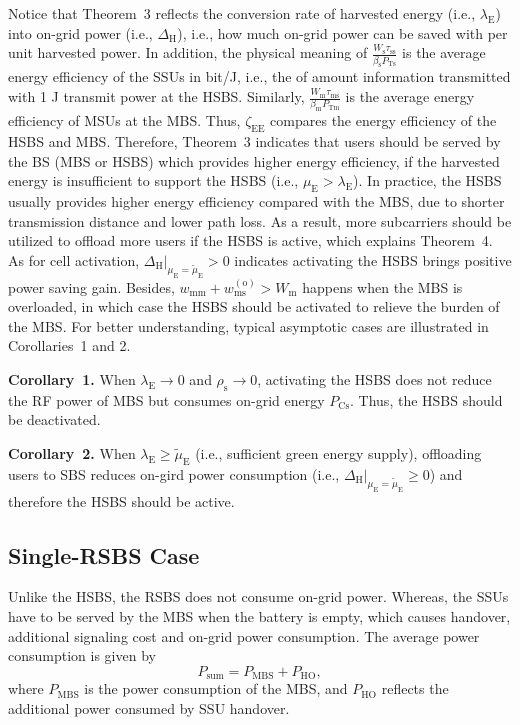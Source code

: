 \documentclass[12pt, draftclsnofoot,onecolumn]{IEEEtran}
\begin{document}
Notice that Theorem~3 reflects the conversion rate of harvested energy (i.e., $\lambda_\mathrm{E}$) into on-grid power (i.e., $\Delta_\mathrm{H}$), i.e., how much on-grid power can be saved with per unit harvested power.
In addition, the physical meaning of $\frac{W_\mathrm{s}\tau_\mathrm{ss}} {\beta_\mathrm{s} P_\mathrm{Ts}}$ is the average energy efficiency of the SSUs in bit/J, i.e., the of amount information transmitted with 1 J transmit power at the HSBS.
Similarly, $\frac{W_\mathrm{m} \tau_\mathrm{ms}}{\beta_\mathrm{m} P_\mathrm{Tm}} $ is the average energy efficiency of MSUs at the MBS.
Thus, $\zeta_\mathrm{EE}$ compares the energy efficiency of the HSBS and MBS.
Therefore, Theorem~3 indicates that users should be served by the BS (MBS or HSBS) which provides higher energy efficiency, if the harvested energy is insufficient to support the HSBS (i.e., $\mu_\mathrm{E}>\lambda_\mathrm{E}$).
In practice, the HSBS usually provides higher energy efficiency compared with the MBS, due to shorter transmission distance and lower path loss.
As a result, more subcarriers should be utilized to offload more users if the HSBS is active, which explains Theorem~4.
As for cell activation, $\Delta_\mathrm{H}|_{{\mu}_\mathrm{E}=\tilde{\mu}_\mathrm{E}}>0$ indicates activating the HSBS brings positive power saving gain.
Besides, $w_\mathrm{mm}+w_\mathrm{ms}^{(\mathrm{o})}>W_\mathrm{m}$ happens when the MBS is overloaded, in which case the HSBS should be activated to relieve the burden of the MBS.
For better understanding, typical asymptotic cases are illustrated in Corollaries~1 and 2.

\textbf{Corollary~1.} When $\lambda_\mathrm{E}\rightarrow 0$ and $\rho_\mathrm{s}\rightarrow 0$, activating the HSBS does not reduce the RF power of MBS but consumes on-grid energy $P_{\mathrm{Cs}}$. Thus, the HSBS should be deactivated.

\textbf{Corollary~2.} When $\lambda_\mathrm{E} \geq \tilde{\mu}_\mathrm{E}$ (i.e., sufficient green energy supply), offloading users to SBS reduces on-gird power consumption (i.e., $\Delta_\mathrm{H}|_{{\mu}_\mathrm{E}=\tilde{\mu}_\mathrm{E}} \geq 0$) and therefore the HSBS should be active.


\subsection{Single-RSBS Case}

Unlike the HSBS, the RSBS does not consume on-grid power.
Whereas, the SSUs have to be served by the MBS when the battery is empty, which causes handover, additional signaling cost and on-grid power consumption.
The average power consumption is given by
\begin{equation}\label{eq_sum_P_RSBS}
    P_\mathrm{sum} = P_\mathrm{MBS} +  P_\mathrm{HO},
\end{equation}
where $P_\mathrm{MBS}$ is the power consumption of the MBS, and $P_\mathrm{HO}$ reflects the additional power consumed by SSU handover.
\end{document}

